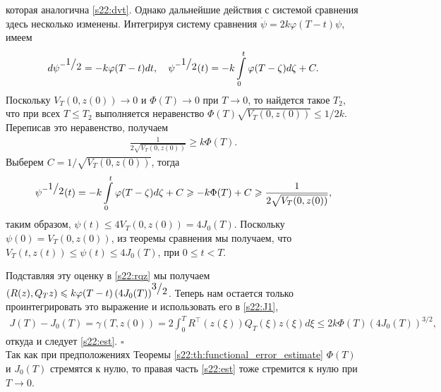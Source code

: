 \documentclass[../main.tex]{subfiles}
\begin{document}
которая аналогична \eqref{s22:dvt}. 
Однако дальнейшие действия с системой сравнения здесь несколько изменены. 
Интегрируя систему сравнения $\dot{\psi} = 2k \varphi(T-t)\psi$, имеем
\begin{gather*}
    d\psi^{-\frc{1}{2}} = -k \varphi(T-t) dt, \quad
    \psi^{-\frc{1}{2}}(t) = -k \int\limits_0^t \varphi(T-\zeta) d\zeta + C.
\end{gather*}
Поскольку $V_T(0,z(0))\to 0$ и $\Phi(T) \to 0$ при $T\to 0$, то найдется такое   $T_2$, что при всех $T\leqslant T_2$ выполняется неравенство $\Phi(T) \sqrt{V_T(0,z(0))}  \leqslant 1/2k$. 
Переписав это неравенство, получаем
\begin{gather*}
    \frac{1}{2\sqrt{V_T(0,z(0))}} \geqslant k\Phi(T).
\end{gather*}  
Выберем $C = 1/\sqrt{V_T(0,z(0))}$, тогда
 \begin{gather*}
\psi^{-\frc{1}{2}}(t) = -k \int\limits_0^t \varphi(T-\zeta) d\zeta + C\geqslant -k\Phi(T)+C\geqslant \frac{1}{2\sqrt{V_T(0,z(0))}}, 
\end{gather*}  
таким образом, $\psi(t) \leqslant 4V_T(0,z(0))=4J_0(T)$. 
Поскольку $\psi(0)=V_T(0,z(0))$, из теоремы сравнения мы получаем, что $V_T(t,z(t))\leqslant \psi(t) \leqslant 4J_0(T)$, при $ 0\leqslant t <T$.

Подставляя эту оценку в  \eqref{s22:rqz} мы получаем  $\left( R(z), Q_T z\right) \leqslant k \varphi(T-t) \left( 4J_0(T) \right) ^{\frc{3}{2}} $.
Теперь нам остается только проинтегрировать это выражение и использовать его в  \eqref{s22:J1},
\begin{gather*}
J(T)-J_0(T)=        \gamma (T,z(0)) = 
         2\int_{0}^{T}  R^{\top}(z(\xi))Q_T(\xi) z(\xi) d\xi\leqslant 2k \Phi(T) (4J_0(T))^{3/2}, 
\end{gather*}
откуда и следует \eqref{s22:est}.
    \hfill $ \square $ \\
Так как при предположениях Теоремы \ref{s22:th:functional_error_estimate}  $\Phi(T)$ и $J_0(T)$ стремятся к нулю, то правая часть  \eqref{s22:est} тоже стремится к нулю при $T\to 0$.
\end{document}

